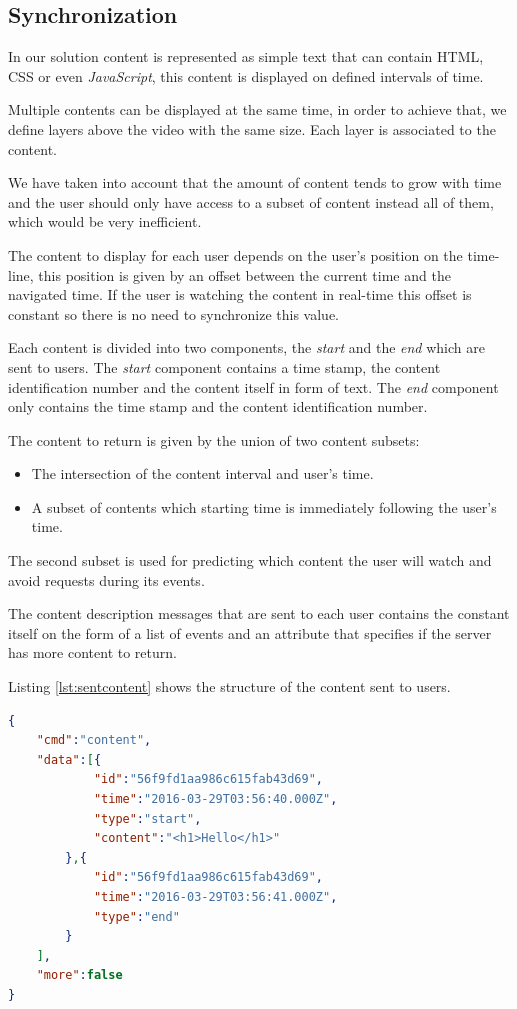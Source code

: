 	\subsection{Synchronization}

	In our solution content is represented as simple text that can contain \ac{HTML}, \ac{CSS} or even \emph{JavaScript}, this content is displayed on defined intervals of time.

	Multiple contents can be displayed at the same time, in order to achieve that, we define layers above the video with the same size. Each layer is associated to the content.

	We have taken into account that the amount of content tends to grow with time and the user should only have access to a subset of content instead all of them, which would be very inefficient.

	The content to display for each user depends on the user's position on the time-line, this position is given by an offset between the current time and the navigated time. If the user is watching the content in real-time this offset is constant so there is no need to synchronize this value.

	Each content is divided into two components, the \emph{start} and the \emph{end} which are sent to users. The \emph{start} component contains a time stamp, the content identification number and the content itself in form of text. The \emph{end} component only contains the time stamp and the content identification number. 

	The content to return is given by the union of two content subsets:
	\begin{itemize}
		\item The intersection of the content interval and user's time.
		\item A subset of contents which starting time is immediately following the user's time.
	\end{itemize}

	The second subset is used for predicting which content the user will watch and avoid requests during its events.

	The content description messages that are sent to each user contains the constant itself on the form of a list of events and an attribute that specifies if the server has more content to return.

	Listing \ref{lst:sentcontent} shows the structure of the content sent to users.

\begin{minipage}{\linewidth}
\begin{lstlisting}[caption={Exampe of content sent to users},label={lst:sentcontent},language=json]
{
	"cmd":"content",
	"data":[{
			"id":"56f9fd1aa986c615fab43d69",
			"time":"2016-03-29T03:56:40.000Z",
			"type":"start",
			"content":"<h1>Hello</h1>"
		},{
			"id":"56f9fd1aa986c615fab43d69",
			"time":"2016-03-29T03:56:41.000Z",
			"type":"end"
		}
	],
	"more":false
}
\end{lstlisting}
\end{minipage}

